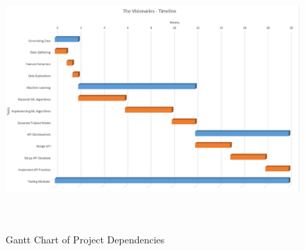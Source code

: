 \documentclass[onecolumn, draftclsnofoot,10pt, compsoc]{IEEEtran}
\begin{document}
\begin{singlespace}
    \begin{figure}[H]
        \centering
        \includegraphics[height=10cm, width=17cm]{Timeline.eps}
        \caption{Gantt Chart of Project Dependencies}
        \label{fig:timeline}
    \end{figure}


\end{singlespace}
\end{document}
